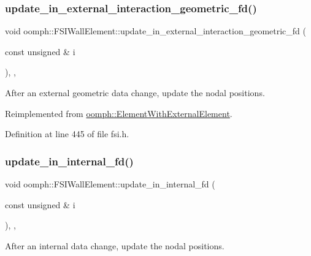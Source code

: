 \subsubsection{\texorpdfstring{update\+\_\+in\+\_\+external\+\_\+interaction\+\_\+geometric\+\_\+fd()}{update\_in\_external\_interaction\_geometric\_fd()}}
{\footnotesize\ttfamily void oomph\+::\+F\+S\+I\+Wall\+Element\+::update\+\_\+in\+\_\+external\+\_\+interaction\+\_\+geometric\+\_\+fd (\begin{DoxyParamCaption}\item[{const unsigned \&}]{i }\end{DoxyParamCaption})\hspace{0.3cm}{\ttfamily [inline]}, {\ttfamily [protected]}, {\ttfamily [virtual]}}



After an external geometric data change, update the nodal positions. 



Reimplemented from \hyperlink{classoomph_1_1ElementWithExternalElement_ab34f7db5cb5a473c6f5552f34af4a651}{oomph\+::\+Element\+With\+External\+Element}.



Definition at line 445 of file fsi.\+h.

\mbox{\label{classoomph_1_1FSIWallElement_ae3b3a1cbaa1b9f467a25f41307135873}} 
\subsubsection{\texorpdfstring{update\+\_\+in\+\_\+internal\+\_\+fd()}{update\_in\_internal\_fd()}}
{\footnotesize\ttfamily void oomph\+::\+F\+S\+I\+Wall\+Element\+::update\+\_\+in\+\_\+internal\+\_\+fd (\begin{DoxyParamCaption}\item[{const unsigned \&}]{i }\end{DoxyParamCaption})\hspace{0.3cm}{\ttfamily [inline]}, {\ttfamily [protected]}, {\ttfamily [virtual]}}



After an internal data change, update the nodal positions. 



